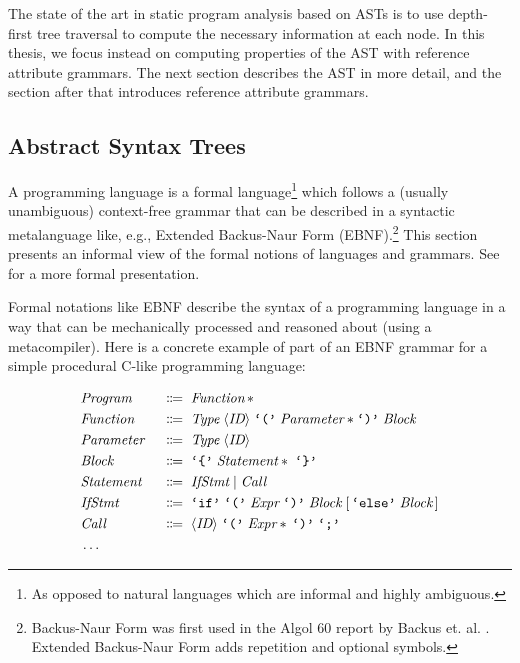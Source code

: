 \documentclass[10pt, twoside, openright]{book}
\begin{document}
The state of the art in static program analysis based on ASTs is to use depth-first tree
traversal to compute the necessary information at each node.
In this thesis, we focus instead on computing properties of the AST with reference attribute grammars.
The next section describes the AST in more detail, and the section
after that introduces reference attribute grammars.


\subsection{Abstract Syntax Trees}

A programming language is a formal language\footnote{As opposed to natural languages which are
informal and highly ambiguous.} which follows a (usually unambiguous) context-free grammar that can be described
in a syntactic metalanguage like, e.g., Extended Backus-Naur Form (EBNF).\footnote{Backus-Naur Form
was first used in the Algol 60 report by Backus et. al.
\cite{DBLP:journals/cacm/BackusBGKMPRSVWWW60}.
Extended Backus-Naur Form adds repetition and optional symbols.}
This section presents an informal view of the formal notions of languages and grammars.
See \textcite{DBLP:books/lib/HopcroftU69} for a more formal presentation.

Formal notations like EBNF describe the syntax of a programming language in a
way that can be mechanically processed and reasoned about (using a
metacompiler).  Here is a concrete example of part of an EBNF grammar for a
simple procedural C-like programming language:

\begin{alignat*}{2}
& \textit{Program}    & & \; \Coloneqq \; \textit{Function}\,\ast \\
& \textit{Function}   & & \; \Coloneqq \; \textit{Type} \; \langle\textit{ID}\rangle \; \texttt{\lq(\rq} \; \textit{Parameter}\ast \texttt{\lq)\rq} \; \textit{Block} \\
& \textit{Parameter}  & & \; \Coloneqq \; \textit{Type} \; \langle\textit{ID}\rangle \\
& \textit{Block}      & & \; \Coloneqq \; \texttt{\lq\{\rq} \; \textit{Statement}\ast \; \texttt{\lq\}\rq} \\
& \textit{Statement}  & & \; \Coloneqq \; \textit{IfStmt} \mid \textit{Call} \\
& \textit{IfStmt}     & & \; \Coloneqq \; \texttt{\lq{}if\rq} \; \texttt{\lq(\rq} \; \textit{Expr} \; \texttt{\lq)\rq}
  \; \textit{Block} \; [ \, \texttt{\lq{}else\rq} \; \textit{Block} \, ] \\
& \textit{Call}       & & \; \Coloneqq \; \langle\textit{ID}\rangle \; \texttt{\lq(\rq} \; \textit{Expr}\ast \, \texttt{\lq)\rq} \; \texttt{\lq;\rq} \\
& \ldots \hfill{} & &
\end{alignat*}
\end{document}
